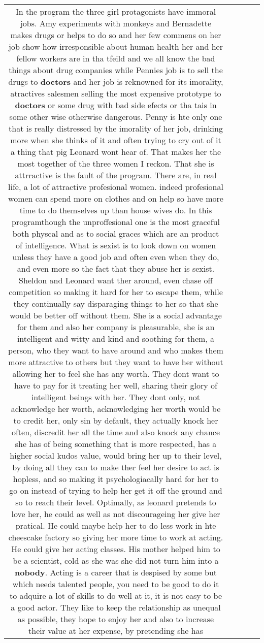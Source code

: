 \documentclass[11pt]{article}
\newlength\mylength
\begin{document}
\begin{center}
\begin{longtable}{|C{.65\mylength}|C{.30\mylength}|C{.12\mylength}|C{.12\mylength}|C{.12\mylength}|}
  \small In the program the three girl protagonists have immoral jobs. Amy experiments with monkeys and Bernadette makes drugs or helps to do so and her few commens on her job show how irresponsible about human health her and her fellow workers are in tha tfeild and we all know the bad things about drug companies while Pennies job is to sell the drugs to \textbf{doctors} and her job is reknowned for its imorality, atractives salesmen selling the most expensive prototype to \textbf{doctors} or some drug with bad side efects or tha tais in some other wise otherwise dangerous. Penny is hte only one that is really distressed by the imorality of her job, drinking more when she thinks of it and often trying to cry out of it a thing that pig Leonard wont hear of. That makes her the most together of the three women I reckon. That she is attrractive is the fault of the program. There are, in real life, a lot of attractive profesional women. indeed profesional women can spend more on clothes and on help so have more time to do themselves up than house wives do. In this programthough  the unproffesional one is the most graceful both physcal and as to social graces which are an product of intelligence. What is sexist is to look down on women unless they have a good job and often even when they do, and even more so the fact that they abuse her is sexist.     Sheldon and Leonard want ther around, even chase off competition so making it hard for her to escape them, while they continually say disparaging things to her so that she would be better off without them. She is a social advantage for them and also her company is pleasurable, she is an intelligent and witty and kind and soothing for them, a person, who they want to have around and who makes them more attractive to others but they want to have her without allowing her to feel she has any worth. They dont want to have to pay for it treating her well, sharing their glory of intelligent beings with her.     They dont only, not acknowledge her worth, acknowledging her worth would be to credit her, only sin by default, they actually knock her often, discredit her all the time and also knock any chance she has of being something that is more respected, has a higher social kudos value, would bring her up to their level, by doing all they can to make ther feel her desire to act is hopless, and so making it psychologiacally hard for her to go on instead of trying to help her get it off the ground and so to reach their level.   Optimally, as leonard pretends to love her,  he could as well as not discourageing her give her pratical. He could maybe help her to do less work in hte cheescake factory so giving her more time to work at acting. He could give her acting classes. His mother helped him to be a scientist, cold as she was she did not turn him into a \textbf{nobody}. Acting is a career that is despised by some but which needs talented people, you need to be good to do it to adquire a lot of skills to do well at it, it is not easy to be a good actor.    They like to keep the relationship as unequal as possible, they hope to enjoy her and also to increase their value at her expense, by pretending she has 
\end{longtable}
\end{center}
\end{document}

